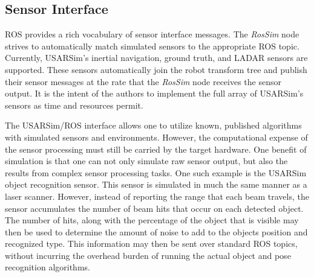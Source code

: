 \subsection*{Sensor Interface} 
ROS provides a rich vocabulary of sensor interface messages. The {\it RosSim} node strives to automatically match simulated sensors to the appropriate ROS topic. Currently, USARSim's inertial navigation, ground truth, and LADAR sensors are supported. These sensors automatically join the robot transform tree and publish their sensor messages at the rate that the {\it RosSim} node receives the sensor output. It is the intent of the authors to implement the full array of USARSim's sensors as time and resources permit.

The USARSim/ROS interface allows one to utilize known, published algorithms with simulated sensors and environments. However, the computational expense of the sensor processing must still be carried by the target hardware. One benefit of simulation is that one can not only simulate raw sensor output, but also the results from complex sensor processing tasks. One such example is the USARSim object recognition sensor. This sensor  is simulated in much the same manner as a laser scanner. However, instead of reporting the range that each beam travels, the sensor accumulates the number of beam hits that occur on each detected object. The number of hits, along with the percentage of the object that is visible may then be used to determine the amount of noise to add to the objects position and recognized type. This information may then be sent over standard ROS topics, without incurring the overhead burden of running the actual object and pose recognition algorithms.
